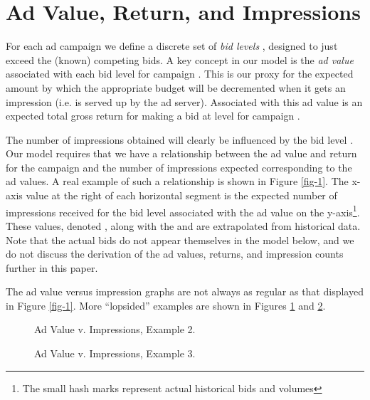 \documentclass[finalversion,simpleeqnnos]{yrl}
\begin{document}
\section{Ad Value, Return, and Impressions}\label{ad-val}

For each ad campaign  we define a discrete set of {\em bid levels} , designed to just exceed the (known) competing bids.
A key concept in our model is the {\em ad value}  associated with each bid level  for campaign . This is our proxy for the expected amount by which the appropriate budget will be decremented when it gets an impression (i.e. is served up by the ad server). Associated with this ad value is an expected total gross return  for making a bid at level  for campaign .

The number of impressions obtained will clearly be influenced by the bid level .  Our model requires that we have a relationship between the ad value and return for the campaign and the number of impressions expected corresponding to the ad values. A real example of such a relationship is shown in Figure \ref{fig-1}. The x-axis value at the right of each horizontal segment is the expected number of impressions received for the bid level associated with the ad value on the y-axis\footnote{The small hash marks represent actual historical bids and volumes}. These values, denoted , along with the  and  are extrapolated from historical data. Note that the actual bids  do not appear themselves in the model below, and we do not discuss the derivation of the ad values, returns, and impression counts further in this paper.

The ad value versus impression graphs are not always as regular as that displayed in Figure \ref{fig-1}. More ``lopsided'' examples are shown in Figures \ref{fig-2} and \ref{fig-3}.
\begin{figure}[htfb]
\begin{center}
\hspace{0.0cm}
\caption{Ad Value v. Impressions, Example 2.} \label{fig-2}
\end{center}
\end{figure}


\begin{figure}[htfb]
\begin{center}
\hspace{0.0cm}
\caption{Ad Value v. Impressions, Example 3.} \label{fig-3}
\end{center}
\end{figure}
\end{document}
